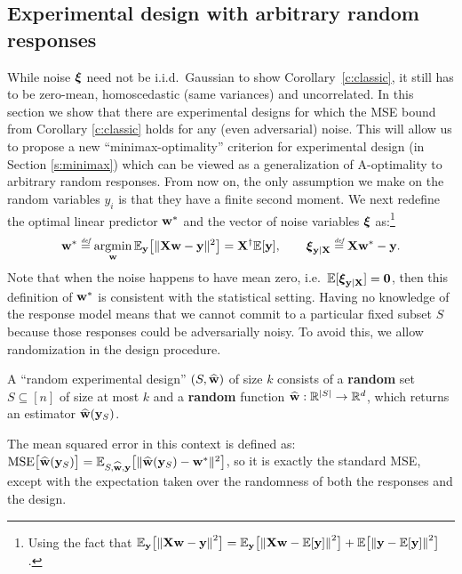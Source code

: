 \documentclass[12pt]{sty/colt2019/colt2018-arxiv}
\begin{document}
\subsection{Experimental design with arbitrary random responses}
While noise $\boldsymbol\xi$ need not be i.i.d.~Gaussian to show
Corollary~\ref{c:classic}, it still has to be
zero-mean, homoscedastic (same variances) and uncorrelated.
In this section we show that there are experimental designs for
which the MSE bound from Corollary \ref{c:classic} holds
for any (even adversarial) noise. This will allow us to propose a new
``minimax-optimality'' criterion for experimental design (in Section
\ref{s:minimax}) which can be viewed as a generalization of
A-optimality to arbitrary random responses. From now on, the only
assumption we make on the random variables $y_i$ is that they have a
finite second moment. We next redefine the optimal linear predictor $\mathbf w^*$
and the vector of noise variables $\boldsymbol\xi$ as:\footnote{Using the fact
  that $\mathbb E_\mathbf y \big[{\| \mathbf X\mathbf w-\mathbf y \|}^2\big]=\mathbb E_\mathbf y
  \big[{\| \mathbf X\mathbf w-\mathbb E[\mathbf y] \|}^2\big] + \mathbb E\big[{\| \mathbf y - \mathbb E[\mathbf y] \|}^2\big]$.} 
\begin{align*}
  \mathbf w^*\stackrel{\textit{\tiny{def}}}{=}  \operatorname*{\mathop{\mathrm{argmin}}}_\mathbf w \mathbb E_\mathbf y \big[\|\mathbf X\mathbf w-\mathbf y\|^2\big]
  	=\mathbf X^\dagger\mathbb E[\mathbf y],\qquad\boldsymbol\xi_{\mathbf y|\mathbf X}\stackrel{\textit{\tiny{def}}}{=} \mathbf X\mathbf w^*-\mathbf y.
\end{align*}
Note that when the noise
  happens to have mean zero, i.e.~$\mathbb E[\boldsymbol\xi_{\mathbf y|\mathbf X}]=\mathbf 0$, then this definition
  of $\mathbf w^*$ is consistent with the statistical setting. Having no
  knowledge of the response model means that we cannot commit to a
  particular fixed subset $S$ because those responses could be
  adversarially noisy. To avoid this, we allow randomization in the design
  procedure.
  \begin{definition}
      \label{d:rand}
A ``random experimental design'' $(S,\widehat{\mathbf w})$ of
size $k$ consists of a \textbf{random} set $S\subseteq [n]$ of size at most $k$
and a \textbf{random} function $\widehat{\mathbf w}:\mathbb R^{|S|}\rightarrow \mathbb R^d$, which
returns an estimator $\widehat{\mathbf w}(\mathbf y_S)$.
\end{definition}
The mean squared error in this context is defined as:
  $\text{MSE}\big[\widehat{\mathbf w}(\mathbf y_S)\big] =
  \mathbb E_{S,\widehat{\mathbf w},\mathbf y}\big[\|\widehat{\mathbf w}(\mathbf y_S)-\mathbf w^*\|^2\big]$,
so it is exactly the standard MSE, except with the expectation taken
over the randomness of both the responses and the design. 
\end{document}
